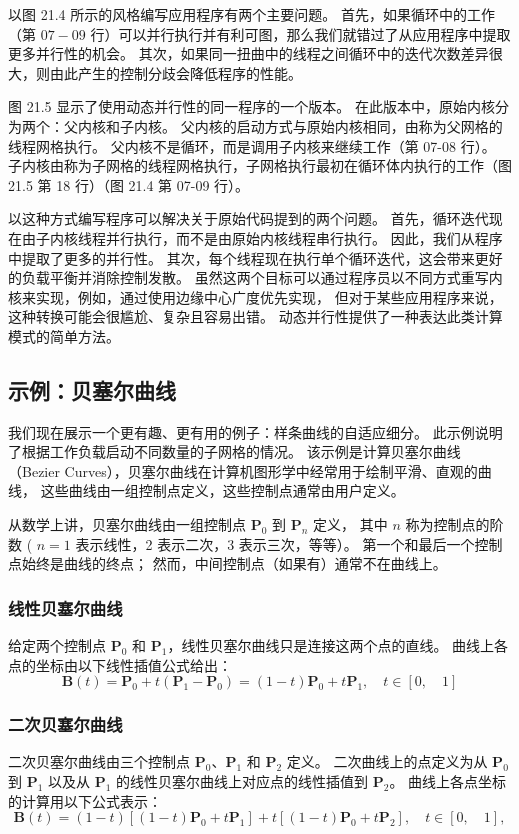 以图 21.4 所示的风格编写应用程序有两个主要问题。 
首先，如果循环中的工作（第 $07-09$ 行）可以并行执行并有利可图，那么我们就错过了从应用程序中提取更多并行性的机会。 
其次，如果同一扭曲中的线程之间循环中的迭代次数差异很大，则由此产生的控制分歧会降低程序的性能。

图 21.5 显示了使用动态并行性的同一程序的一个版本。 在此版本中，原始内核分为两个：父内核和子内核。 
父内核的启动方式与原始内核相同，由称为父网格的线程网格执行。 父内核不是循环，而是调用子内核来继续工作（第 07-08 行）。 
子内核由称为子网格的线程网格执行，子网格执行最初在循环体内执行的工作（图 21.5 第 18 行）（图 21.4 第 07-09 行）。

以这种方式编写程序可以解决关于原始代码提到的两个问题。 
首先，循环迭代现在由子内核线程并行执行，而不是由原始内核线程串行执行。 因此，我们从程序中提取了更多的并行性。 
其次，每个线程现在执行单个循环迭代，这会带来更好的负载平衡并消除控制发散。 
虽然这两个目标可以通过程序员以不同方式重写内核来实现，例如，通过使用边缘中心广度优先实现，
但对于某些应用程序来说，这种转换可能会很尴尬、复杂且容易出错。 动态并行性提供了一种表达此类计算模式的简单方法。

\subsection{示例：贝塞尔曲线}
我们现在展示一个更有趣、更有用的例子：样条曲线的自适应细分。 此示例说明了根据工作负载启动不同数量的子网格的情况。 
该示例是计算贝塞尔曲线（Bezier Curves），贝塞尔曲线在计算机图形学中经常用于绘制平滑、直观的曲线，
这些曲线由一组控制点定义，这些控制点通常由用户定义。

从数学上讲，贝塞尔曲线由一组控制点 $\mathbf{P}_{0}$ 到 $\mathbf{P}_{n}$ 定义，
其中 $n$ 称为控制点的阶数 ( $n =1$ 表示线性，2 表示二次，3 表示三次，等等）。 
第一个和最后一个控制点始终是曲线的终点； 然而，中间控制点（如果有）通常不在曲线上。

\subsubsection{线性贝塞尔曲线}
给定两个控制点 $\mathbf{P}_{0}$ 和 $\mathbf{P}_{1}$，线性贝塞尔曲线只是连接这两个点的直线。 
曲线上各点的坐标由以下线性插值公式给出：
$$
\mathbf{B}(t)=\mathbf{P}_{0}+t\left(\mathbf{P}_{1}-\mathbf{P}_{0}\right)=(1-t ) \mathbf{P}_{0}+t \mathbf{P}_{1}, \quad t \in[0, \quad 1]
$$

\subsubsection{二次贝塞尔曲线}
二次贝塞尔曲线由三个控制点 $\mathbf{P}_{0}、\mathbf{P}_{1}$ 和 $\mathbf{P}_{2}$ 定义。 
二次曲线上的点定义为从 $\mathbf{P}_{0}$ 到 $\mathbf{P}_{1}$ 
以及从 $\mathbf{P}_{1}$ 的线性贝塞尔曲线上对应点的线性插值到 $\mathbf{P}_{2}$。 曲线上各点坐标的计算用以下公式表示：
$$
\mathbf{B}(t)=(1-t)\left[(1-t) \mathbf{P}_{0}+t \mathbf{P}_{1}\right]+t\left[ (1-t) \mathbf{P}_{0}+t \mathbf{P}_{2}\right], \quad t \in[0, \quad 1],
$$

